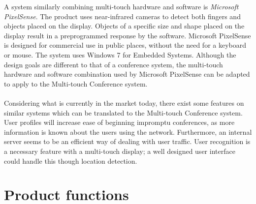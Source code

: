 \documentclass[12p, a4paper, onecolumn]{report}
\begin{document}
A system similarly combining multi-touch hardware and software is \emph{Microsoft PixelSense}. The product uses near-infrared cameras to detect both fingers and objects placed on the display. Objects of a specific size and shape placed on the display result in a preprogrammed response by the software. Microsoft PixelSense is designed for commercial use in public places, without the need for a keyboard or mouse. The system uses Windows 7 for Embedded Systems. Although the design goals are different to that of a conference system, the multi-touch hardware and software combination used by Microsoft PixelSense can be adapted to apply to the Multi-touch Conference system. \\ \\
Considering what is currently in the market today, there exist some features on similar systems which can be translated to the Multi-touch Conference system. User profiles will increase ease of beginning impromptu conferences, as more information is known about the users using the network. Furthermore, an internal server seems to be an efficient way of dealing with user traffic. User recognition is a necessary feature with a multi-touch display; a well designed user interface could handle this though location detection.

\newpage

\section{Product functions}
\end{document}
